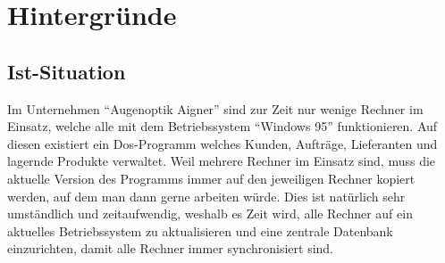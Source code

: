 \chapter{Hintergründe}\label{cha:theoretical-background}
\section{Ist-Situation}
Im Unternehmen “Augenoptik Aigner” sind zur Zeit nur wenige Rechner im Einsatz, welche alle mit dem Betriebssystem “Windows 95” funktionieren. Auf diesen existiert ein Dos-Programm welches Kunden,  Aufträge, Lieferanten und lagernde Produkte  verwaltet. Weil mehrere Rechner im Einsatz sind, muss die aktuelle Version des Programms immer auf den jeweiligen Rechner kopiert werden, auf dem man dann gerne arbeiten würde. Dies ist natürlich sehr umständlich und zeitaufwendig, weshalb es Zeit wird, alle Rechner auf ein aktuelles Betriebssystem zu aktualisieren und eine zentrale Datenbank einzurichten, damit alle Rechner immer synchronisiert sind.
